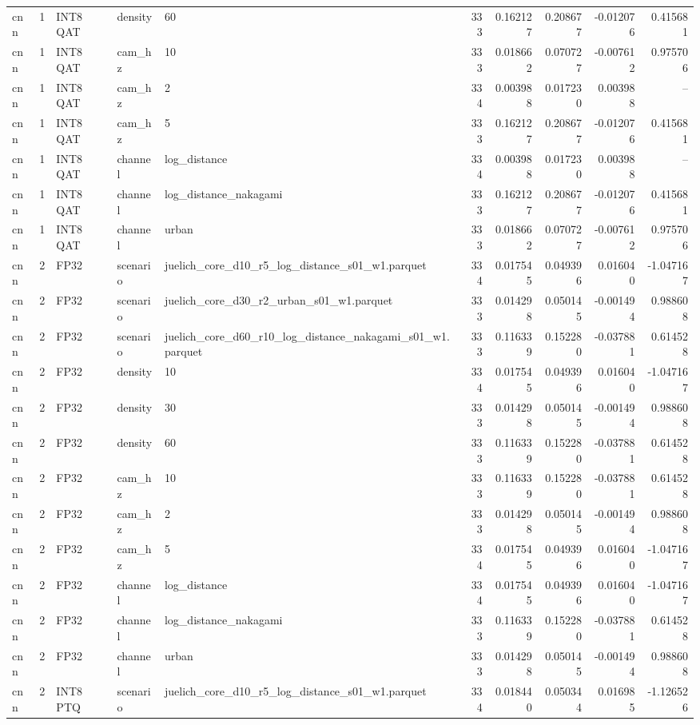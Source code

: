\begin{tabular}{lrlllrrrrr}
cnn & 1 & INT8 QAT & density & 60 & 333 & 0.162127 & 0.208677 & -0.012076 & 0.415681 \\
cnn & 1 & INT8 QAT & cam\_hz & 10 & 333 & 0.018662 & 0.070727 & -0.007612 & 0.975706 \\
cnn & 1 & INT8 QAT & cam\_hz & 2 & 334 & 0.003988 & 0.017230 & 0.003988 & -- \\
cnn & 1 & INT8 QAT & cam\_hz & 5 & 333 & 0.162127 & 0.208677 & -0.012076 & 0.415681 \\
cnn & 1 & INT8 QAT & channel & log\_distance & 334 & 0.003988 & 0.017230 & 0.003988 & -- \\
cnn & 1 & INT8 QAT & channel & log\_distance\_nakagami & 333 & 0.162127 & 0.208677 & -0.012076 & 0.415681 \\
cnn & 1 & INT8 QAT & channel & urban & 333 & 0.018662 & 0.070727 & -0.007612 & 0.975706 \\
cnn & 2 & FP32 & scenario & juelich\_core\_d10\_r5\_log\_distance\_s01\_w1.parquet & 334 & 0.017545 & 0.049396 & 0.016040 & -1.047167 \\
cnn & 2 & FP32 & scenario & juelich\_core\_d30\_r2\_urban\_s01\_w1.parquet & 333 & 0.014298 & 0.050145 & -0.001494 & 0.988608 \\
cnn & 2 & FP32 & scenario & juelich\_core\_d60\_r10\_log\_distance\_nakagami\_s01\_w1.parquet & 333 & 0.116339 & 0.152280 & -0.037881 & 0.614528 \\
cnn & 2 & FP32 & density & 10 & 334 & 0.017545 & 0.049396 & 0.016040 & -1.047167 \\
cnn & 2 & FP32 & density & 30 & 333 & 0.014298 & 0.050145 & -0.001494 & 0.988608 \\
cnn & 2 & FP32 & density & 60 & 333 & 0.116339 & 0.152280 & -0.037881 & 0.614528 \\
cnn & 2 & FP32 & cam\_hz & 10 & 333 & 0.116339 & 0.152280 & -0.037881 & 0.614528 \\
cnn & 2 & FP32 & cam\_hz & 2 & 333 & 0.014298 & 0.050145 & -0.001494 & 0.988608 \\
cnn & 2 & FP32 & cam\_hz & 5 & 334 & 0.017545 & 0.049396 & 0.016040 & -1.047167 \\
cnn & 2 & FP32 & channel & log\_distance & 334 & 0.017545 & 0.049396 & 0.016040 & -1.047167 \\
cnn & 2 & FP32 & channel & log\_distance\_nakagami & 333 & 0.116339 & 0.152280 & -0.037881 & 0.614528 \\
cnn & 2 & FP32 & channel & urban & 333 & 0.014298 & 0.050145 & -0.001494 & 0.988608 \\
cnn & 2 & INT8 PTQ & scenario & juelich\_core\_d10\_r5\_log\_distance\_s01\_w1.parquet & 334 & 0.018440 & 0.050344 & 0.016985 & -1.126526 \\

\end{tabular}
